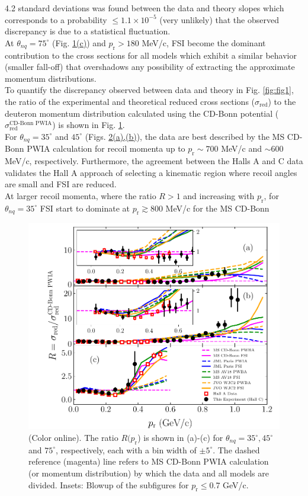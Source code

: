 \documentclass[aps,prl,twocolumn,showpacs,superscriptaddress,groupedaddress]{revtex4-2}  %
\begin{document}
4.2 standard deviations was found between the data and theory slopes which corresponds to a probability $\leq 1.1\times 10^{-5}$ (very unlikely) that the observed discrepancy is due to a statistical fluctuation. \\ 
\indent At $\theta_{nq}=75^{\circ}$ (Fig. \hyperref[fig:fig1]{1(c)}) and $p_{\mathrm{r}}>180$ MeV/c, FSI become the dominant contribution to the cross sections for all models which exhibit a similar
behavior (smaller fall-off) that overshadows any possibility of extracting the approximate momentum distributions.\\
\indent To quantify the discrepancy observed between data and theory in Fig. \ref{fig:fig1}, the ratio of the experimental and theoretical reduced cross sections ($\sigma_{\mathrm{red}}$) to the
deuteron momentum distribution calculated using the CD-Bonn potential ($\sigma^{\text{CD-Bonn PWIA}}_{\mathrm{red}}$) \cite{PhysRevC.63.024001} is shown in Fig. \ref{fig:fig2}. \\
\indent For $\theta_{nq}=35^{\circ}$ and $45^{\circ}$ (Figs. \hyperref[fig:fig2]{2(a),(b)}), the data are best described by the MS CD-Bonn PWIA calculation for recoil momenta up
to $p_{\mathrm{r}}\sim700$ MeV/c and $\sim600$ MeV/c, respectively. Furthermore, the agreement between the Halls A and C data validates the Hall A approach of selecting a kinematic
region where recoil angles are small and FSI are reduced. \\
\indent At larger recoil momenta, where the ratio $R>1$ and increasing with $p_{\mathrm{r}}$, for $\theta_{nq}=35^{\circ}$ FSI start to dominate at
$p_{\mathrm{r}} \gtrsim 800$ MeV/c for the MS CD-Bonn
\begin{figure}[!t]
\includegraphics[scale=0.5]{PRL_plot2.pdf}
\caption{(Color online). The ratio $R(p_{\mathrm{r}}$) is shown in (a)-(c) for $\theta_{nq}=35^{\circ}, 45^{\circ}$ and $75^{\circ}$, respectively, each with a bin width of $\pm 5^{\circ}$.
  The dashed reference (magenta) line refers to MS CD-Bonn PWIA calculation (or momentum distribution) by which the data and all models are divided.
  Insets: Blowup of the subfigures for $p_{\mathrm{r}}\leq$0.7 GeV/c.}
\label{fig:fig2}
\end{figure}
\end{document}
